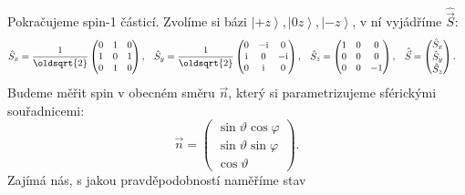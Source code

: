 \documentclass[10pt,a4paper]{article}
\newcommand{\const}[1]{\text{#1}}
\newcommand{\mat}[1]{
    \begin{pmatrix}
        #1
    \end{pmatrix}
}
\newcommand{\ket}[1]{\left| #1 \right>}
\renewcommand{\i}{\const{i}}
\newcommand{\vechat}[1]{\hat{\vec{#1}}}
\begin{document}
Pokračujeme spin-1 částicí. Zvolíme si bázi $\ket{+z}, \ket{0z}, \ket{-z}$, v ní vyjádříme $\vechat S$:
\begin{align*}
    \hat S_x &= \frac{1}{\oldsqrt{2}} \mat{
        0 & 1 & 0 \\
        1 & 0 & 1 \\
        0 & 1 & 0
    },
    &
    \hat S_y &= \frac{1}{\oldsqrt{2}} \mat{
        0 & -\i & 0 \\
        \i & 0 & -\i \\
        0 & \i & 0
    },
    &
    \hat S_z &= \mat{
        1 & 0 & 0 \\
        0 & 0 & 0 \\
        0 & 0 & -1
    },
    &
    \vechat S &= \mat{
        \hat S_x \\
        \hat S_y \\
        \hat S_z
    }.
\end{align*}
Budeme měřit spin v obecném směru $\vec n$, který si parametrizujeme sférickými souřadnicemi:
\begin{equation*}
    \vec n = \mat{
        \sin \vartheta \cos \varphi \\
        \sin \vartheta \sin \varphi \\
        \cos \vartheta
    }.
\end{equation*}
Zajímá nás, s jakou pravděpodobností naměříme stav
\end{document}
